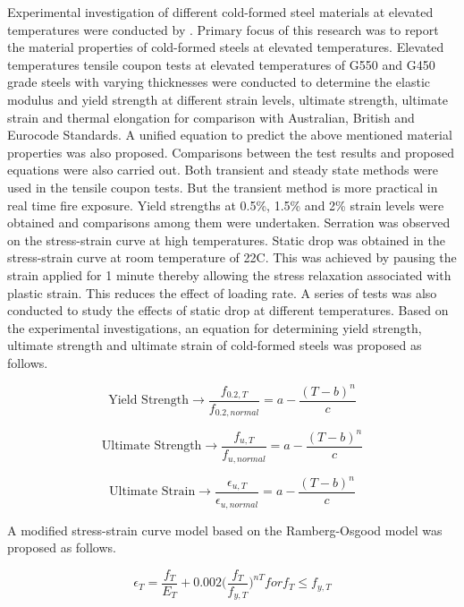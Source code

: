 Experimental investigation of different cold-formed steel materials at elevated temperatures were conducted by \citet{Chen2007}. Primary focus of this research was to report the material properties of cold-formed steels at elevated temperatures. Elevated temperatures tensile coupon tests at elevated temperatures of G550 and G450 grade steels with varying thicknesses were conducted to determine the elastic modulus and yield strength at different strain levels, ultimate strength, ultimate strain and thermal elongation for comparison with Australian, British and Eurocode Standards. A unified equation to predict the above mentioned material properties was also proposed. Comparisons between the test results and proposed equations were also carried out. Both transient and steady state methods were used in the tensile coupon tests. But the transient method is more practical in real time fire exposure. Yield strengths at 0.5\%, 1.5\% and 2\% strain levels were obtained and comparisons among them were undertaken. Serration was observed on the stress-strain curve at high temperatures. Static drop was obtained in the stress-strain curve at room temperature of 22\degree C. This was achieved by pausing the strain applied for 1 minute thereby allowing the stress relaxation associated with plastic strain. This reduces the effect of loading rate. A series of tests was also conducted to study the effects of static drop at different temperatures. Based on the experimental investigations, an equation for determining yield strength, ultimate strength and ultimate strain of cold-formed steels was proposed as follows.

\begin{equation}
\text{Yield Strength} \to \dfrac{f_{0.2,T}}{f_{0.2,normal}} = a-\dfrac{(T-b)^{n}}{c}
\end{equation}

\begin{equation}
\text{Ultimate Strength} \to \dfrac{f_{u,T}}{f_{u,normal}} = a-\dfrac{(T-b)^{n}}{c}
\end{equation}

\begin{equation}
\text{Ultimate Strain} \to \dfrac{\epsilon_{u,T}}{\epsilon_{u,normal}} = a-\dfrac{(T-b)^{n}}{c}
\end{equation}

A modified stress-strain curve model based on the Ramberg-Osgood model was proposed as follows.

\begin{equation}
\epsilon_T = \dfrac{f_T}{E_T}+0.002\big(\dfrac{f_T}{f_{y,T}}\big)^{nT} for f_T \leq f_{y,T}
\end{equation}

